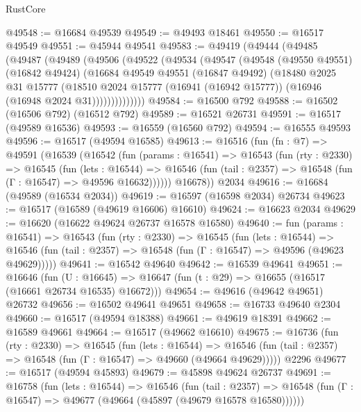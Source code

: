 \begin{lexlean}{RustCore}
\begin{coremodule}
@49548 := @16684 @49539
@49549 := @49493 @18461
@49550 := @16517 @49549
@49551 := @45944 @49541
@49583 := @49419
    (@49444
      (@49485
        (@49487
          (@49489
            (@49506
              (@49522
                (@49534
                  (@49547
                    (@49548
                      (@49550 @49551)
                      (@16842 @49424)
                      (@16684
                        @49549
                        @49551
                        (@16847 @49492)
                        (@18480
                          @2025
                          @31
                          @15777
                          (@18510
                            @2024
                            @15777
                            (@16941 (@16942 @15777))
                            (@16946 (@16948 @2024 @31))))))))))))))
@49584 := @16500 @792
@49588 := @16502 (@16506 @792) (@16512 @792)
@49589 := @16521 @26731
@49591 := @16517 (@49589 @16536)
@49593 := @16559 (@16560 @792)
@49594 := @16555 @49593
@49596 := @16517 (@49594 @16585)
@49613 := @16516
    (fun (fn : @7) =>
    @49591
      (@16539
        (@16542
          (fun (params : @16541) =>
          @16543
            (fun (rty : @2330) =>
            @16545
              (fun (lets : @16544) =>
              @16546 (fun (tail : @2357) => @16548 (fun (Γ : @16547) => @49596 @16632))))))
        @16678))
    @2034
@49616 := @16684 (@49589 (@16534 @2034))
@49619 := @16597 (@16598 @2034) @26734
@49623 := @16517 (@16589 (@49619 @16606) @16610)
@49624 := @16623 @2034
@49629 := @16620 (@16622 @49624 @26737 @16578 @16580)
@49640 := fun (params : @16541) =>
  @16543
    (fun (rty : @2330) =>
    @16545
      (fun (lets : @16544) =>
      @16546 (fun (tail : @2357) => @16548 (fun (Γ : @16547) => @49596 (@49623 @49629)))))
@49641 := @16542 @49640
@49642 := @16539 @49641
@49651 := @16646
    (fun (U : @16645) => @16647 (fun (t : @29) => @16655 (@16517 (@16661 @26734 @16535) @16672)))
@49654 := @49616 (@49642 @49651) @26732
@49656 := @16502 @49641 @49651
@49658 := @16733 @49640 @2304
@49660 := @16517 (@49594 @18388)
@49661 := @49619 @18391
@49662 := @16589 @49661
@49664 := @16517 (@49662 @16610)
@49675 := @16736
    (fun (rty : @2330) =>
    @16545
      (fun (lets : @16544) =>
      @16546 (fun (tail : @2357) => @16548 (fun (Γ : @16547) => @49660 (@49664 @49629)))))
    @2296
@49677 := @16517 (@49594 @45893)
@49679 := @45898 @49624 @26737
@49691 := @16758
    (fun (lets : @16544) =>
    @16546
      (fun (tail : @2357) =>
      @16548 (fun (Γ : @16547) => @49677 (@49664 (@45897 (@49679 @16578 @16580))))))

\end{coremodule}
\end{lexlean}
